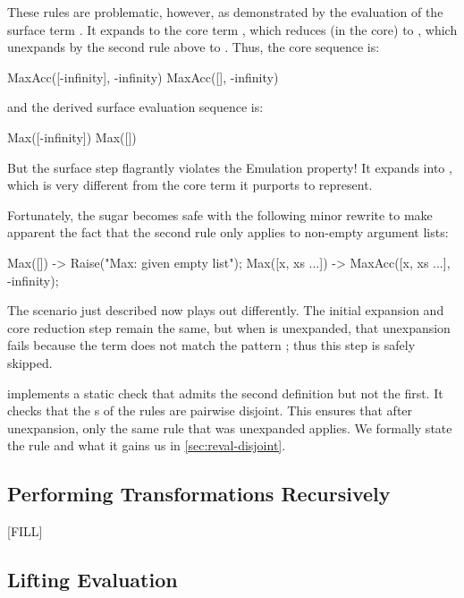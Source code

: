 These rules are problematic, however, as demonstrated by the evaluation of
the surface term . It expands to the core term
, which reduces (in the core)
to , which unexpands by the second rule above to
. Thus, the core sequence is:
\begin{Codes}
    MaxAcc([-infinity], -infinity)
\CoreStep MaxAcc([], -infinity)
\end{Codes}
and the derived surface evaluation sequence is:
\begin{Codes}
    Max([-infinity])
\SurfStep Max([])
\end{Codes}

But the  surface step flagrantly violates the Emulation
property! It expands into , which is very
different from the core term  it purports to
represent.

Fortunately, the  sugar becomes safe with the following minor
rewrite to make apparent the fact that the second rule only applies to
non-empty argument lists:
\begin{Codes}
Max([]) -> Raise("Max: given empty list");
Max([x, xs ...]) -> MaxAcc([x, xs ...], -infinity);
\end{Codes}
The scenario just described now plays out differently. The initial
expansion and core reduction step remain the same, but when
 is unexpanded, that unexpansion fails because
the term does not match the  pattern ; thus this step is safely skipped.

{\Resugarer} implements a static check that admits the second definition
but not the first. It checks that the s of the rules are pairwise
disjoint. This
ensures that after unexpansion, only the same rule that was unexpanded
applies. We formally state the rule and what it gains us in
\cref{sec:reval-disjoint}.

\subsection{Performing Transformations Recursively}
\label{sec:reval-manyrule}

[FILL]

\subsection{Lifting Evaluation}
\label{sec:lifting}


